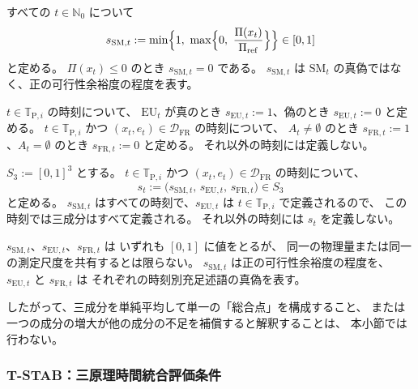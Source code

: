 \begin{definition}
\label{def:s_sm}
すべての $t\in\mathbb{N}_0$ について
\[
  s_{\mathrm{SM},t}
  :=
  \min\Bigl\{1,\ \max\Bigl\{0,\ \frac{\Pi(x_t)}{\Pi_{\mathrm{ref}}}\Bigr\}\Bigr\}
  \in[0,1]
\]
と定める。
$\Pi(x_t)\le0$ のとき $s_{\mathrm{SM},t}=0$ である。
$s_{\mathrm{SM},t}$ は $\mathrm{SM}_t$ の真偽ではなく、正の可行性余裕度の程度を表す。
\end{definition}

\begin{definition}
\label{def:s_eu}
\label{def:s_fr}
$t\in\mathbb{T}_{\mathrm{P},i}$ の時刻について、
$\mathrm{EU}_t$ が真のとき $s_{\mathrm{EU},t}:=1$、偽のとき $s_{\mathrm{EU},t}:=0$ と定める。
$t\in\mathbb{T}_{\mathrm{P},i}$ かつ $(x_t,e_t)\in\mathcal{D}_{\mathrm{FR}}$ の時刻について、
$A_t\neq\emptyset$ のとき $s_{\mathrm{FR},t}:=1$、$A_t=\emptyset$ のとき $s_{\mathrm{FR},t}:=0$ と定める。
それ以外の時刻には定義しない。
\end{definition}

\begin{definition}
\label{def:S3}
$S_3:=[0,1]^3$ とする。
$t\in\mathbb{T}_{\mathrm{P},i}$ かつ $(x_t,e_t)\in\mathcal{D}_{\mathrm{FR}}$ の時刻について、
\[
  s_t:=\bigl(s_{\mathrm{SM},t},\,s_{\mathrm{EU},t},\,s_{\mathrm{FR},t}\bigr)\in S_3
\]
と定める。
$s_{\mathrm{SM},t}$ はすべての時刻で、$s_{\mathrm{EU},t}$ は $t\in\mathbb{T}_{\mathrm{P},i}$ で定義されるので、
この時刻では三成分はすべて定義される。
それ以外の時刻には $s_t$ を定義しない。
\end{definition}

\begin{remark}[三成分は同一物理量ではない]
\label{rem:s3_noncommensurate}
$s_{\mathrm{SM},t}$、$s_{\mathrm{EU},t}$、$s_{\mathrm{FR},t}$ は
いずれも $[0,1]$ に値をとるが、
同一の物理量または同一の測定尺度を共有するとは限らない。
$s_{\mathrm{SM},t}$ は正の可行性余裕度の程度を、
$s_{\mathrm{EU},t}$ と $s_{\mathrm{FR},t}$ は
それぞれの時刻別充足述語の真偽を表す。

したがって、三成分を単純平均して単一の「総合点」を構成すること、
または一つの成分の増大が他の成分の不足を補償すると解釈することは、
本小節では行わない。
\end{remark}

\subsubsection{T-STAB：三原理時間統合評価条件}

